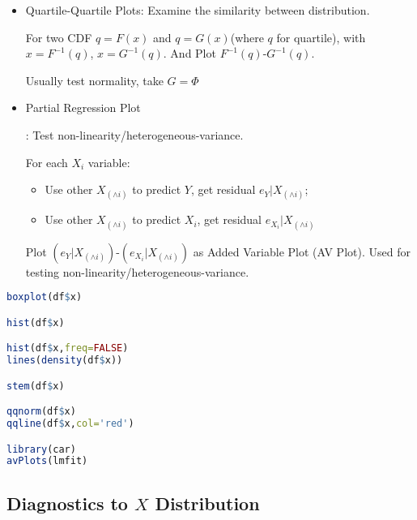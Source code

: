 \begin{itemize}[topsep=2pt,itemsep=0pt]
        \item Quartile-Quartile Plots\hypertarget{QQplot}{}: Examine the similarity  between distribution.
            
        For two CDF $ q=F(x) $ and $ q=G(x) $(where $ q $ for quartile), with $ x=F^{-1}(q) $, $ x=G^{-1}(q) $. And Plot $ F^{-1}(q) $-$ G^{-1}(q) $.

        Usually test normality, take $ G=\Phi  $



        \item \hypertarget{AVPlot}{Partial Regression Plot}: Test non-linearity/heterogeneous-variance.
    
        For each $ X_i $ variable: 
        \begin{itemize}[topsep=2pt,itemsep=0pt]
            \item Use other $ X_{(\wedge i)} $ to predict $ Y $, get residual $ e_Y|X_{(\wedge i)} $;
            \item Use other $ X_{(\wedge i)} $ to predict $ X_i $, get residual $ e_{X_i}|X_{(\wedge i)} $
        \end{itemize}
        
        Plot $ (e_Y|X_{(\wedge i)}) $-$ (e_{X_i}|X_{(\wedge i)}) $ as Added Variable Plot (AV Plot). Used for testing non-linearity/heterogeneous-variance.
    \end{itemize}

     
\begin{rcode}
\begin{lstlisting}[language=R]
boxplot(df$x)

hist(df$x)

hist(df$x,freq=FALSE)
lines(density(df$x))

stem(df$x)

qqnorm(df$x)
qqline(df$x,col='red')

library(car)
avPlots(lmfit)
\end{lstlisting}

\end{rcode}




    
\subsection{Diagnostics to $ X $ Distribution}\label{SubSecXDiagnostics}


